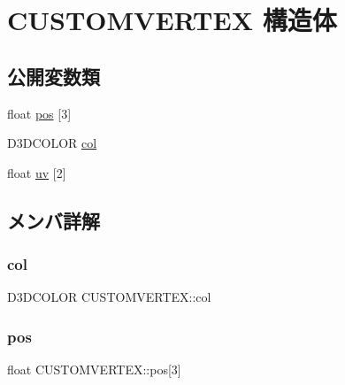 \hypertarget{struct_c_u_s_t_o_m_v_e_r_t_e_x}{}\section{C\+U\+S\+T\+O\+M\+V\+E\+R\+T\+EX 構造体}
\label{struct_c_u_s_t_o_m_v_e_r_t_e_x}
\subsection*{公開変数類}
\begin{DoxyCompactItemize}
\item 
float \mbox{\hyperlink{struct_c_u_s_t_o_m_v_e_r_t_e_x_acbccf678628bfc243d77a99c1d7c7af3}{pos}} \mbox{[}3\mbox{]}
\item 
D3\+D\+C\+O\+L\+OR \mbox{\hyperlink{struct_c_u_s_t_o_m_v_e_r_t_e_x_a89194164a47349e936f21e10bb29f26a}{col}}
\item 
float \mbox{\hyperlink{struct_c_u_s_t_o_m_v_e_r_t_e_x_a2c27e901db37bc828fb408010596304c}{uv}} \mbox{[}2\mbox{]}
\end{DoxyCompactItemize}


\subsection{メンバ詳解}
\mbox{\label{struct_c_u_s_t_o_m_v_e_r_t_e_x_a89194164a47349e936f21e10bb29f26a}} 
\subsubsection{\texorpdfstring{col}{col}}
{\footnotesize\ttfamily D3\+D\+C\+O\+L\+OR C\+U\+S\+T\+O\+M\+V\+E\+R\+T\+E\+X\+::col}

\mbox{\label{struct_c_u_s_t_o_m_v_e_r_t_e_x_acbccf678628bfc243d77a99c1d7c7af3}} 
\subsubsection{\texorpdfstring{pos}{pos}}
{\footnotesize\ttfamily float C\+U\+S\+T\+O\+M\+V\+E\+R\+T\+E\+X\+::pos\mbox{[}3\mbox{]}}

